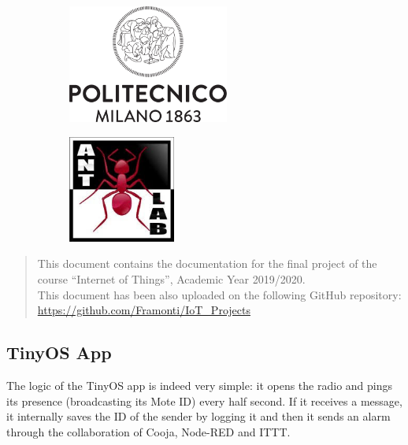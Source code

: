 \documentclass[12pt]{article}
\begin{document}
\begin{titlepage}

\begin{figure}[h]
	\begin{subfigure}{0.5\textwidth}
		\includegraphics[width=150pt, left]{Logo_Politecnico_Milano.png}
	\end{subfigure} 
	\begin{subfigure}{0.5\textwidth}
		\includegraphics[width=100pt, right]{Ant_Lab_Logo.png}
	\end{subfigure}
\end{figure} 
 

\vfill

\end{titlepage}
\begin{abstract}
This document contains the documentation for the final project of the course ``Internet of Things'', Academic Year 2019/2020. \\
This document has been also uploaded on the following GitHub repository: \url{https://github.com/Framonti/IoT_Projects}\\
\end{abstract}
\subsection{TinyOS App}
The logic of the TinyOS app is indeed very simple: it opens the radio and pings its presence (broadcasting its Mote ID) every half second. If it receives a message, it internally saves the ID of the sender by logging it and then it sends an alarm through the collaboration of Cooja, Node-RED and ITTT. 
\end{document}
